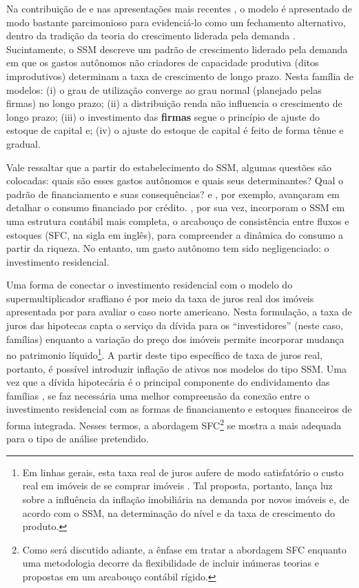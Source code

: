 Na contribuição de \textcite{serrano_sraffian_1995} e nas apresentações mais recentes \cite{freitas_growth_2015}, o modelo é apresentado de modo bastante parcimonioso para evidenciá-lo como um fechamento alternativo, dentro da tradição da teoria do crescimento liderada pela demanda \cite{serrano_sraffian_2017}. 
Sucintamente, o SSM descreve um padrão de crescimento liderado pela demanda em que os gastos autônomos não criadores de capacidade produtiva (ditos improdutivos) determinam a taxa de crescimento de longo prazo. 
Nesta família de modelos: 
(i) o grau de utilização converge ao grau normal (planejado pelas firmas) no longo prazo; 
(ii) a distribuição renda não influencia o crescimento de longo prazo; 
(iii) o investimento das \textbf{firmas} segue o princípio de ajuste do estoque de capital e;
(iv) o ajuste do estoque de capital é feito de forma tênue e gradual. 






Vale ressaltar que a partir do estabelecimento do SSM, algumas questões são colocadas: quais são esses gastos autônomos e quais seus determinantes? Qual o padrão de financiamento e suas consequências? \textcite{pariboni_household_2016} e \textcite{fagundes_dinamica_2017}, por exemplo, avançaram em detalhar o consumo financiado por crédito.  \textcite{brochier_supermultiplier_2018}, por sua vez, incorporam o SSM em uma estrutura contábil mais completa, o arcabouço de consistência entre fluxos e estoques (SFC, na sigla em inglês), para compreender a dinâmica do consumo a partir da riqueza. No entanto, um gasto autônomo tem sido negligenciado: o investimento residencial. 

Uma forma de conectar o investimento residencial com o modelo do supermultiplicador sraffiano é por meio da taxa de juros real dos imóveis apresentada por \textcite{teixeira_crescimento_2015} para avaliar o caso norte americano. Nesta formulação, a taxa de juros das hipotecas capta o serviço da dívida para os ``investidores'' (neste caso, famílias) enquanto a variação do preço dos imóveis permite incorporar mudança no patrimonio líquido\footnote{Em linhas gerais, esta taxa real de juros aufere de modo satisfatório o custo real em imóveis de se comprar imóveis \cite[p.~53]{teixeira_crescimento_2015}. Tal proposta, portanto, lança luz sobre a influência da inflação imobiliária na demanda por novos imóveis e, de acordo com o SSM, na determinação do nível e da taxa de crescimento do produto.}. 
A partir deste tipo específico de taxa de juros real, portanto, é possível introduzir inflação de ativos nos modelos do tipo SSM. 
Uma vez que a dívida hipotecária é o principal componente do endividamento das famílias \cite{van_gunten_varieties_2018}, se faz necessária uma melhor compreensão da conexão entre o investimento residencial com as formas de financiamento e estoques financeiros de forma integrada.
Nesses termos, a abordagem SFC\footnote{Como será discutido adiante, a ênfase em tratar a abordagem SFC enquanto uma metodologia decorre da flexibilidade de incluir inúmeras teorias e propostas em um arcabouço contábil rígido. } se mostra a mais adequada para o tipo de análise pretendido. 


